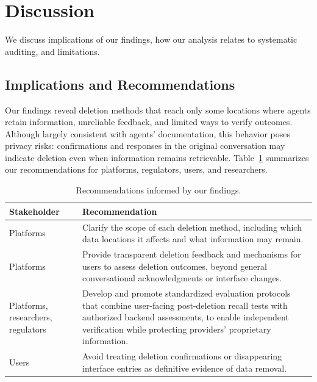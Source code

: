 \section{Discussion}
\label{sec:discussion}

We discuss implications of our findings, how our analysis relates to systematic auditing, and limitations.

\subsection{Implications and Recommendations}

Our findings reveal deletion methods that reach only some locations where agents retain information, unreliable feedback, and limited ways to verify outcomes.
%
Although largely consistent with agents' documentation, this behavior poses privacy risks: confirmations and responses in the original conversation may indicate deletion even when information remains retrievable.
%
Table~\ref{tab:recommendations} summarizes our recommendations for platforms, regulators, users, and researchers.

\begin{table}[!t]
\centering
\caption{Recommendations informed by our findings.}
\label{tab:recommendations}
\footnotesize
\setlength{\tabcolsep}{3pt}
\begin{tabular}{@{}p{}p{}@{}}
\toprule
Stakeholder & Recommendation \\
\midrule
Platforms &
Clarify the scope of each deletion method, including which data locations it affects and what information may remain. \\
\addlinespace
Platforms &
Provide transparent deletion feedback and mechanisms for users to assess deletion outcomes, beyond general conversational acknowledgments or interface changes. \\
\addlinespace
Platforms, researchers, regulators &
Develop and promote standardized evaluation protocols that combine user-facing post-deletion recall tests with authorized backend assessments, to enable independent verification while protecting providers' proprietary information. \\
\addlinespace
Users &
Avoid treating deletion confirmations or disappearing interface entries as definitive evidence of data removal. \\
\bottomrule
\end{tabular}
\end{table}

